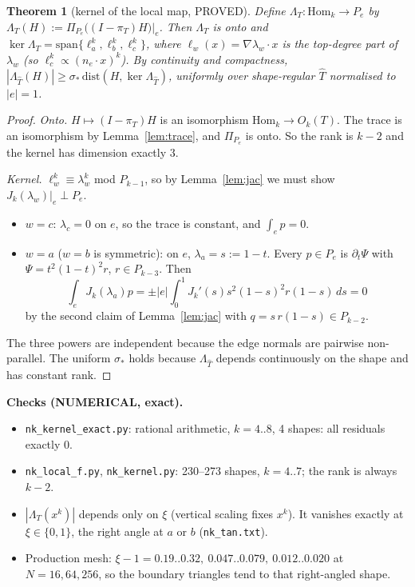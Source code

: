 \documentclass[11pt]{article}
\newtheorem{theorem}{Theorem}[section]
\theoremstyle{remark}
\begin{document}
\begin{theorem}[kernel of the local map, PROVED]\label{thm:kernel}
Define $\Lambda_T:\mathrm{Hom}_k\to P_e$ by $\Lambda_T(H):=\Pi_{P_e}\big((I-\pi_T)H\big)|_e$. Then $\Lambda_T$ is onto and
$\ker\Lambda_T=\mathrm{span}\{\ell_a^k,\ell_b^k,\ell_c^k\}$, where $\ell_w(x)=\nabla\lambda_w\cdot x$ is the top-degree part of
$\lambda_w$ (so $\ell_c^k\propto(n_e\cdot x)^k$). By continuity and compactness,
$|\Lambda_{\hat T}(H)|\ge\sigma_\ast\,\mathrm{dist}(H,\ker\Lambda_{\hat T})$, uniformly over shape-regular $\hat T$ normalised to
$|e|=1$.
\end{theorem}
\begin{proof}
\emph{Onto.} $H\mapsto(I-\pi_T)H$ is an isomorphism $\mathrm{Hom}_k\to O_k(T)$. The trace is an isomorphism by
Lemma~\ref{lem:trace}, and $\Pi_{P_e}$ is onto. So the rank is $k-2$ and the kernel has dimension exactly $3$.

\emph{Kernel.} $\ell_w^k\equiv\lambda_w^k$ mod $P_{k-1}$, so by Lemma~\ref{lem:jac} we must show $J_k(\lambda_w)|_e\perp P_e$.
\begin{itemize}
\item $w=c$: $\lambda_c=0$ on $e$, so the trace is constant, and $\int_ep=0$.
\item $w=a$ ($w=b$ is symmetric): on $e$, $\lambda_a=s:=1-t$. Every $p\in P_e$ is $\partial_t\Psi$ with
$\Psi=t^2(1-t)^2r$, $r\in P_{k-3}$. Then
\[
\int_eJ_k(\lambda_a)p=\pm|e|\int_0^1J_k'(s)s^2(1-s)^2r(1-s)\,ds=0
\]
by the second claim of Lemma~\ref{lem:jac} with $q=s\,r(1-s)\in P_{k-2}$.
\end{itemize}
The three powers are independent because the edge normals are pairwise non-parallel. The uniform $\sigma_\ast$ holds because
$\Lambda_{\hat T}$ depends continuously on the shape and has constant rank.
\end{proof}

\noindent\textbf{Checks (NUMERICAL, exact).}
\begin{itemize}
\item \texttt{nk\_kernel\_exact.py}: rational arithmetic, $k=4..8$, 4 shapes: all residuals exactly $0$.
\item \texttt{nk\_local\_f.py}, \texttt{nk\_kernel.py}: 230--273 shapes, $k=4..7$; the rank is always $k-2$.
\item $|\Lambda_T(x^k)|$ depends only on $\xi$ (vertical scaling fixes $x^k$). It vanishes exactly at $\xi\in\{0,1\}$, the
right angle at $a$ or $b$ (\texttt{nk\_tan.txt}).
\item Production mesh: $\xi-1=0.19..0.32,\ 0.047..0.079,\ 0.012..0.020$ at $N=16,64,256$, so the boundary triangles tend to
that right-angled shape.
\end{itemize}
\end{document}
